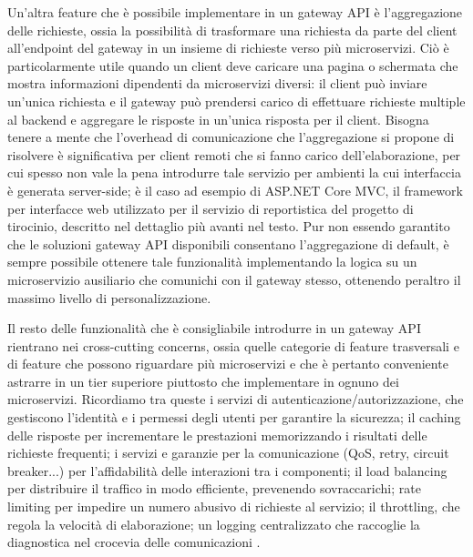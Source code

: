 Un'altra feature che è possibile implementare in un gateway API è l'aggregazione delle richieste, ossia la possibilità di trasformare una richiesta da parte del client all'endpoint del gateway in un insieme di richieste verso più microservizi. Ciò è particolarmente utile quando un client deve caricare una pagina o schermata che mostra informazioni dipendenti da microservizi diversi: il client può inviare un'unica richiesta e il gateway può prendersi carico di effettuare richieste multiple al backend e aggregare le risposte in un'unica risposta per il client.
Bisogna tenere a mente che l'overhead di comunicazione che l'aggregazione si propone di risolvere è significativa per client remoti che si fanno carico dell'elaborazione, per cui spesso non vale la pena introdurre tale servizio per ambienti la cui interfaccia è generata server-side; è il caso ad esempio di ASP.NET Core MVC, il framework per interfacce web utilizzato per il servizio di reportistica del progetto di tirocinio, descritto nel dettaglio più avanti nel testo.
Pur non essendo garantito che le soluzioni gateway API disponibili consentano l'aggregazione di default, è sempre possibile ottenere tale funzionalità implementando la logica su un microservizio ausiliario che comunichi con il gateway stesso, ottenendo peraltro il massimo livello di personalizzazione.

Il resto delle funzionalità che è consigliabile introdurre in un gateway API rientrano nei cross-cutting concerns, ossia quelle categorie di feature trasversali e di feature che possono riguardare più microservizi e che è pertanto conveniente astrarre in un tier superiore piuttosto che implementare in ognuno dei microservizi. Ricordiamo tra queste i servizi di autenticazione/autorizzazione, che gestiscono l'identità e i permessi degli utenti per garantire la sicurezza; il caching delle risposte per incrementare le prestazioni memorizzando i risultati delle richieste frequenti; i servizi e garanzie per la comunicazione (QoS, retry, circuit breaker...) per l'affidabilità delle interazioni tra i componenti; il load balancing per distribuire il traffico in modo efficiente, prevenendo sovraccarichi; rate limiting per impedire un numero abusivo di richieste al servizio; il throttling, che regola la velocità di elaborazione; un logging centralizzato che raccoglie la diagnostica nel crocevia delle comunicazioni \cite[pp.44-45]{.NET_Microservices}.

